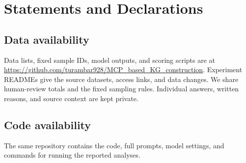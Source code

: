\section*{Statements and Declarations}

\subsection*{Data availability}
Data lists, fixed sample IDs, model outputs, and scoring scripts are at
\url{https://github.com/turambar928/MCP_based_KG_construction}.
Experiment READMEs give the source datasets, access links, and data changes.
We share human-review totals and the fixed sampling rules.
Individual answers, written reasons, and source context are kept private.

\subsection*{Code availability}
The same repository contains the code, full prompts, model settings,
and commands for running the reported analyses.
